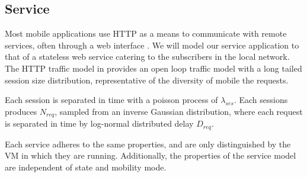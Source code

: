 \subsection{Service}
Most mobile applications use HTTP as a means to communicate with remote services, often through a web interface \cite{maier2010first,falaki2010first}. We will model our service application to that of a stateless web service catering to the subscribers in the local network. The HTTP traffic model in \cite{liu2001traffic} provides an open loop traffic model with a long tailed session size distribution, representative of the diversity of mobile the requests. 

Each session is separated in time with a poisson process of $\lambda_{ses}$. Each sessions produces $N_{req}$, sampled from an inverse Gaussian distribution, where each request is separated in time by log-normal distributed delay $D_{req}$.

Each service adheres to the same properties, and are only distinguished by the VM in which they are running. Additionally, the properties of the service model are independent of \ue{} state and mobility mode.

